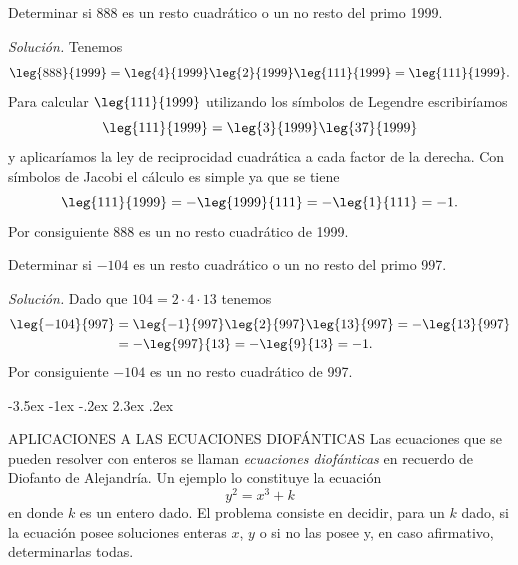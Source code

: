 \documentclass[12pt,a4paper]{book}
\makeatletter
\renewcommand\section{\@startsection{section}{1}{\z@}%
  {-3.5ex \@plus -1ex \@minus -.2ex}%
  {2.3ex \@plus .2ex}%
  {\normalfont\Large\bfseries\raggedright}}
\makeatother
\begin{document}
    \begin{ejemplo}
        Determinar si 888 es un resto cuadrático o un no resto del primo 1999.

        \textit{Solución.} Tenemos
        \begin{equation*}
            \leg{888}{1999}=\leg{4}{1999}\leg{2}{1999}\leg{111}{1999}=\leg{111}{1999}.
        \end{equation*}
        Para calcular $\leg{111}{1999}$ utilizando los símbolos de Legendre escribiríamos
        \begin{equation*}
            \leg{111}{1999}=\leg{3}{1999}\leg{37}{1999}
        \end{equation*}
        y aplicaríamos la ley de reciprocidad cuadrática a cada factor de la derecha. Con
        símbolos de Jacobi el cálculo es simple ya que se tiene
        \begin{equation*}
            \leg{111}{1999}=-\leg{1999}{111}=-\leg{1}{111}=-1.
        \end{equation*}
        Por consiguiente 888 es un no resto cuadrático de 1999.
    \end{ejemplo}

    \begin{ejemplo}
        Determinar si $-104$ es un resto cuadrático o un no resto del primo 997.

        \textit{Solución.} Dado que $104=2\cdot4\cdot13$ tenemos
        \begin{align*}
            \leg{-104}{997}&=\leg{-1}{997}\leg{2}{997}\leg{13}{997}=-\leg{13}{997}\\
            &=-\leg{997}{13}=-\leg{9}{13}=-1.
        \end{align*}
        Por consiguiente $-104$ es un no resto cuadrático de 997.
    \end{ejemplo}

    \section{APLICACIONES A LAS ECUACIONES DIOFÁNTICAS}
    Las ecuaciones que se pueden resolver con enteros se llaman \textit{ecuaciones
    diofánticas} en recuerdo de Diofanto de Alejandría. Un ejemplo lo constituye la
    ecuación
    \begin{equation}\label{eq:9-9}
        y^{2}=x^{3}+k
    \end{equation}
    en donde $k$ es un entero dado. El problema consiste en decidir, para un $k$ dado, si
    la ecuación posee soluciones enteras $x$, $y$ o si no las posee y, en caso afirmativo,
    determinarlas todas.
\end{document}
